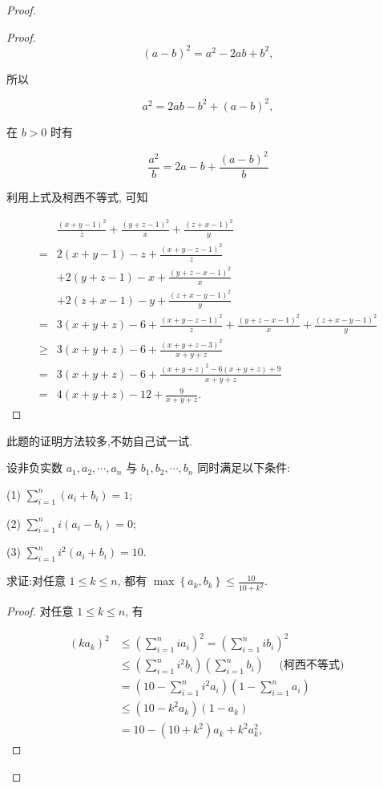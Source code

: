 \begin{proof}
\begin{proof}
	$$
	(a-b)^{2}=a^{2}-2 a b+b^{2},
	$$
	
	所以
	
	$$
	a^{2}=2 a b-b^{2}+(a-b)^{2},
	$$
	
	在 $b>0$ 时有
	
	$$
	\frac{a^{2}}{b}=2 a-b+\frac{(a-b)^{2}}{b}
	$$
	
	利用上式及柯西不等式, 可知
	
	$$
	\begin{aligned}
	& \frac{(x+y-1)^{2}}{z}+\frac{(y+z-1)^{2}}{x}+\frac{(z+x-1)^{2}}{y} \\
	= & 2(x+y-1)-z+\frac{(x+y-z-1)^{2}}{z} \\
	& +2(y+z-1)-x+\frac{(y+z-x-1)^{2}}{x} \\
	& +2(z+x-1)-y+\frac{(z+x-y-1)^{2}}{y} \\
	= & 3(x+y+z)-6+\frac{(x+y-z-1)^{2}}{z}+\frac{(y+z-x-1)^{2}}{x}+\frac{(z+x-y-1)^{2}}{y} \\
	\geqslant & 3(x+y+z)-6+\frac{(x+y+z-3)^{2}}{x+y+z} \\
	= & 3(x+y+z)-6+\frac{(x+y+z)^{2}-6(x+y+z)+9}{x+y+z} \\
	= & 4(x+y+z)-12+\frac{9}{x+y+z} .
	\end{aligned}
	$$
\end{proof}
\begin{note}
	此题的证明方法较多,不妨自己试一试.
\end{note}

\begin{example}
	设非负实数 $a_{1}, a_{2}, \cdots, a_{n}$ 与 $b_{1}, b_{2}, \cdots, b_{n}$ 同时满足以下条件:
	
	(1) $\sum_{i=1}^{n}\left(a_{i}+b_{i}\right)=1$;
	
	(2) $\sum_{i=1}^{n} i\left(a_{i}-b_{i}\right)=0$;
	
	(3) $\sum_{i=1}^{n} i^{2}\left(a_{i}+b_{i}\right)=10$.
	
	求证:对任意 $1 \leqslant k \leqslant n$, 都有 $\max \left\{a_{k}, b_{k}\right\} \leqslant \frac{10}{10+k^{2}}$.
\end{example}
\begin{proof}
	对任意 $1 \leqslant k \leqslant n$, 有
	
	$$
	\begin{aligned}
	\left(k a_{k}\right)^{2} & \leqslant\left(\sum_{i=1}^{n} i a_{i}\right)^{2}=\left(\sum_{i=1}^{n} i b_{i}\right)^{2} \\
	& \leqslant\left(\sum_{i=1}^{n} i^{2} b_{i}\right)\left(\sum_{i=1}^{n} b_{i}\right) \quad \text { (柯西不等式) } \\
	& =\left(10-\sum_{i=1}^{n} i^{2} a_{i}\right)\left(1-\sum_{i=1}^{n} a_{i}\right) \\
	& \leqslant\left(10-k^{2} a_{k}\right)\left(1-a_{k}\right) \\
	& =10-\left(10+k^{2}\right) a_{k}+k^{2} a_{k}^{2},
	\end{aligned}
	$$
	

\end{proof}
\end{proof}
